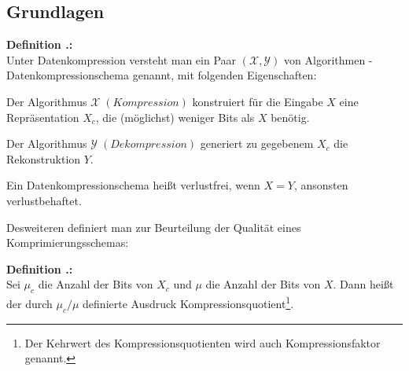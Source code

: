 \documentclass[a4paper,12pt]{article}
\newcommand{\X}{\mathcal X}
\newcommand{\Y}{\mathcal Y}
\newcounter{Definition}
\newcounter{Algorithmus}
\newenvironment{Definition}{
\bigskip
        
        \setlength{\parindent}{0pt}
        \addtocounter{Definition}{1}
        \textbf{\textsf{Definition \thesubsection.\theDefinition}:}\\}{
        \nopagebreak
        \vspace{-1.0ex}
        \bigskip
        
}
\begin{document}
\subsection{Grundlagen}
\begin{Definition}
Unter Datenkompression versteht man ein Paar $(\X,\Y)$ von Algorithmen - Datenkompressionschema genannt, mit folgenden Eigenschaften:

Der Algorithmus $\X \; \left(Kompression\right)$ konstruiert für die Eingabe $X$ eine Repräsentation $X_c$, die (möglichst) weniger Bits als $X$ benötig.
\par
Der Algorithmus  $\Y \; \left(Dekompression\right)$ generiert zu gegebenem $X_c$ die Rekonstruktion $Y$.
\par
 Ein Datenkompressionschema heißt verlustfrei, wenn $X = Y$, ansonsten verlustbehaftet.
\end{Definition}
Desweiteren definiert man zur Beurteilung der Qualität eines Komprimierungsschemas:
\begin{Definition}
Sei $\mu_c$ die Anzahl der Bits von $X_c$ und $\mu$ die Anzahl der Bits von $X$. Dann heißt der durch
$
\mu_c \slash \mu
$
definierte Ausdruck Kompressionsquotient\footnote{\footnotesize{Der Kehrwert des Kompressionsquotienten wird auch Kompressionsfaktor genannt.}}.
\end{Definition}
\end{document}
